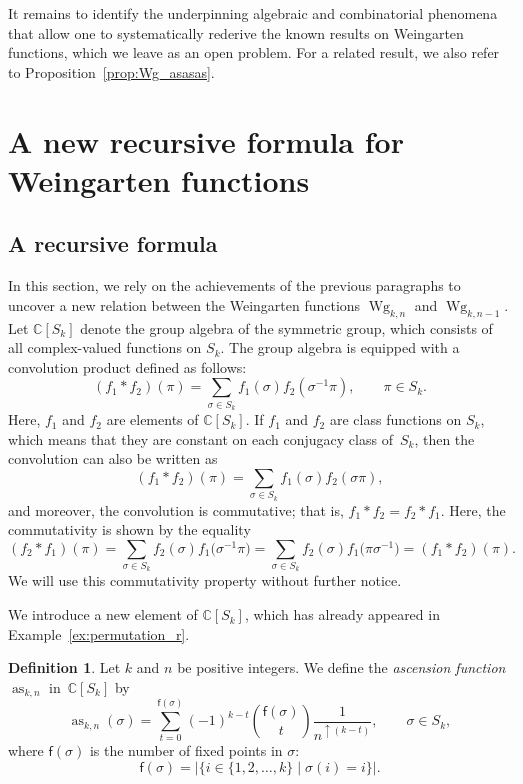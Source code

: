 \documentclass[10pt,a4paper]{amsart}
\numberwithin{equation}{section}
\theoremstyle{definition}
\newtheorem{Definition}[Theorem]{Definition}
\newcommand{\fix}[1]{\mathsf{f}(#1)}
\DeclareMathOperator{\Raise}{as}
\DeclareMathOperator{\Wg}{Wg}
\begin{document}
It remains to identify the underpinning algebraic and combinatorial phenomena that allow one to systematically rederive the known results on Weingarten functions, which we leave as an open problem.
For a related result, we also refer to Proposition~\ref{prop:Wg_asasas}.

\section{A new recursive formula for Weingarten functions} \label{section:Wg_recursive}

\subsection{A recursive formula}

In this section, we rely on the achievements of the previous paragraphs to uncover a new relation between the Weingarten functions
$\Wg_{k,n}$ and $\Wg_{k,n-1}$.
Let $\mathbb{C}[S_k]$ denote the group algebra of the symmetric group,
which consists of all complex-valued functions on $S_k$.
The group algebra is equipped with a convolution product defined as follows:
\[
(f_1*f_2)(\pi)= \sum_{\sigma \in S_k} f_1(\sigma) f_2(\sigma^{-1} \pi), \qquad \pi \in S_k.
\]
Here, $f_1$ and $f_2$ are elements of $\mathbb{C}[S_k]$.
If $f_1$ and $f_2$ are class functions on $S_k$, which means that they are constant on each conjugacy class of~$S_k$,
then the convolution can also be written as
\[
(f_1*f_2)(\pi)= \sum_{\sigma \in S_k} f_1(\sigma) f_2(\sigma \pi),
\]
and moreover, the convolution is commutative; that is, $f_1*f_2=f_2*f_1$.
Here, the commutativity is shown by the equality
\[
(f_2*f_1)(\pi) =\sum_{\sigma \in S_k} f_2(\sigma) f_1\bigl(\sigma^{-1} \pi\bigr)
= \sum_{\sigma \in S_k} f_2(\sigma) f_1\bigl(\pi \sigma^{-1}\bigr) =(f_1*f_2)(\pi).
\]
We will use this commutativity property without further notice.

We introduce a new element of $\mathbb{C}[S_k]$, which has already appeared in Example~\ref{ex:permutation_r}.

\begin{Definition} \label{def:function_a}
Let $k$ and $n$ be positive integers.
We define the \emph{ascension function} $\Raise_{k,n}$ in~$\mathbb{C}[S_k]$ by
 \[
\Raise_{k,n}(\sigma)= \sum_{t=0}^{\fix{\sigma}} (-1)^{k-t} \binom{\fix{\sigma}}{t} \frac{1}{n^{\uparrow (k-t)}},
\qquad \sigma \in S_k,
 \]
 where $\fix{\sigma}$ is the number of fixed points in $\sigma$:
 \[
 \fix{\sigma} =|\{i \in \{1,2,\dots,k\} \mid \sigma(i)=i\}|.
 \]
\end{Definition}
\end{document}
